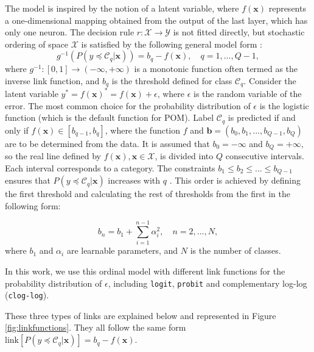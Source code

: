 \documentclass[journal]{IEEEtran}
\begin{document}
	The model is inspired by the notion of a latent variable, where $f(\textbf{x})$ represents a one-dimensional mapping obtained from the output of the last layer, which has only one neuron. The decision rule $r: \mathcal{X} \rightarrow \mathcal{Y}$ is not fitted directly, but stochastic ordering of space $\mathcal{X}$ is satisfied by the following general model form \cite{herbrich2000large}:
	\begin{equation}
		g^{-1}(P(y \preceq \mathcal{C}_q | \mathbf{x})) = b_q - f(\mathbf{x}), \quad q = 1, ..., Q-1,
	\end{equation}
	where $g^{-1} : [0,1] \rightarrow (-\infty, +\infty)$ is a monotonic function often termed as the inverse link function, and $b_q$ is the threshold defined for class $\mathcal{C}_q$. Consider the latent variable $y^* = f(\mathbf{x})^* = f(\mathbf{x}) + \epsilon$, where $\epsilon$ is the random variable of the error. The most common choice for the probability distribution of $\epsilon$ is the logistic function (which is the default function for POM). Label $\mathcal{C}_q$ is predicted if and only if $f(\mathbf{x}) \in [b_{q-1}, b_q]$, where the function $f$ and $\mathbf{b} = (b_0, b_1, ..., b_{Q-1}, b_Q)$ are to be determined from the data. It is assumed that $b_0 = -\infty$ and $b_Q = +\infty$, so the real line defined by $f(\textbf{x}), \textbf{x} \in \mathcal{X}$, is divided into $Q$ consecutive intervals. Each interval corresponds to a category. The constraints $b_1 \le b_2 \le ... \le b_{Q-1}$ ensures that $P(y \preceq \mathcal{C}_q | \mathbf{x})$ increases with $q$ \cite{mccullagh1980regression}.
	This order is achieved by defining the first threshold and calculating the rest of thresholds from the first in the following form:
	
	\begin{equation}
	b_n = b_1 + \sum_{i=1}^{n-1} \alpha_i^2, \quad n = 2, ..., N,
	\end{equation}
	where $b_1$ and $\alpha_i$ are learnable parameters, and $N$ is the number of classes.
	
	In this work, we use this ordinal model with different link functions for the probability distribution of $\epsilon$, including \texttt{logit}, \texttt{probit} and complementary log-log (\texttt{clog-log}).
	
	These three types of links are explained below and represented in Figure \ref{fig:linkfunctions}. They all follow the same form $\text{link}[P(y \preceq \mathcal{C}_q | \mathbf{x})] = b_q - f(\mathbf{x})$.
			
\end{document}
